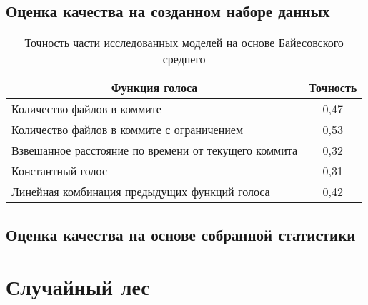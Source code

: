 \subsection{Оценка качества на созданном наборе данных}
\begin{table}[!h]
\caption{Точность части исследованных моделей на основе Байесовского среднего}\label{bayes-offline-result-table}
\centering
\begin{tabular}{|l|c|}\hline
\multicolumn{1}{|c|}{\textbf{Функция голоса}} & \textbf{Точность}\\\hline
Количество файлов в коммите & 0,47\\\hline
Количество файлов в коммите с ограничением  & \uline{0,53} \\\hline
Взвешанное расстояние по времени от текущего коммита  & 0,32\\\hline
Константный голос  & 0,31\\\hline
Линейная комбинация предыдущих функций голоса  & 0,42\\\hline
\end{tabular}
\end{table}
\subsection{Оценка качества на основе собранной статистики}
\section{Случайный лес}
